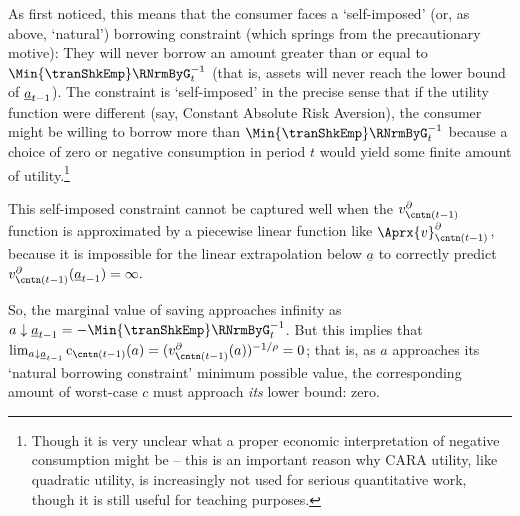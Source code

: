 \documentclass[titlepage, headings=optiontotocandhead]{econark}
\begin{document}
{As \cite{zeldesStochastic} first noticed, this means that the consumer faces a `self-imposed' (or, as above, `natural') borrowing constraint (which springs from the precautionary motive): They will never borrow an amount greater than or equal to $\Min{\tranShkEmp}\RNrmByG_{t}^{-1}$ (that is, assets will never reach the lower bound of $\underline{a}_{t-1}$).  The constraint is `self-imposed' in the precise sense that if the utility function were different (say, Constant Absolute Risk Aversion), the consumer might be willing to borrow more than $\Min{\tranShkEmp}\RNrmByG_{t}^{-1}$ because a choice of zero or negative consumption in period $t$ would yield some finite amount of utility.\footnote{Though it is very unclear what a proper economic interpretation of negative consumption might be -- this is an important reason why CARA utility, like quadratic utility, is increasingly not used for serious quantitative work, though it is still useful for teaching purposes.}

This self-imposed constraint cannot be captured well when the $v^{\partial}_{{\cntn}(t-1)}$ function is approximated by a piecewise linear function like $\Aprx{v}^{\partial}_{{\cntn}(t-1)}$, because it is impossible for the linear extrapolation below ${\underline{a}}$ to correctly predict $v^{\partial}_{{\cntn}(t-1)}(\NatBoroCnstra_{t-1})=\infty.$ %


So, the marginal value of saving approaches infinity as $a \downarrow \NatBoroCnstra_{t-1}=-\Min{\tranShkEmp}\RNrmByG_{t}^{-1}$.  But this implies that $\lim_{a \downarrow \NatBoroCnstra_{t-1}} \mathrm{c}_{{\cntn}(t-1)}(a) = (v^{\partial}_{{\cntn}(t-1)}(a))^{-1/\rho} = 0$; that is, as $a$ approaches its `natural borrowing constraint' minimum possible value, the corresponding amount of worst-case $c$ must approach \textit{its} lower bound: zero.

}
\end{document}
